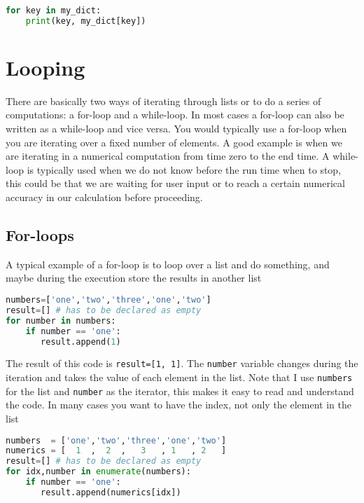 \documentclass[graybox,sectrefs,envcountresetchap,open=right,final]{svmonodo}
\begin{document}
\begin{lstlisting}[language=python,style=blue1bar]
for key in my_dict:
    print(key, my_dict[key])

\end{lstlisting}


\section{Looping}
There are basically two ways of iterating through lists or to do a series of computations: a for-loop and a while-loop. In most cases a for-loop can also be written as a while-loop and vice versa. You would typically use a for-loop when you are iterating over a fixed number of elements. A good example is when we are iterating in a numerical computation from time zero to the end time. A while-loop is typically used when we do not know before the run time when to stop, this could be that we are waiting for user input or to reach a certain numerical accuracy in our calculation before proceeding.

\subsection{For-loops}
A typical example of a for-loop is to loop over a list and do something, and maybe during the execution store the results in another list






\begin{lstlisting}[language=python,style=blue1bar]
numbers=['one','two','three','one','two']
result=[] # has to be declared as empty
for number in numbers:
    if number == 'one':
       result.append(1) 

\end{lstlisting}

The result of this code is \texttt{result=[1, 1]}. The \texttt{number} variable changes during the iteration and takes the value of each element in the list. Note that I use \texttt{numbers} for the list and \texttt{number} as the iterator, this makes it easy to read and understand the code. In many cases you want to have the index, not only the element in the list







\begin{lstlisting}[language=python,style=blue1bar]
numbers  = ['one','two','three','one','two']
numerics = [  1  ,  2  ,   3   , 1   , 2   ]
result=[] # has to be declared as empty
for idx,number in enumerate(numbers):
    if number == 'one':
       result.append(numerics[idx]) 

\end{lstlisting}
\end{document}
